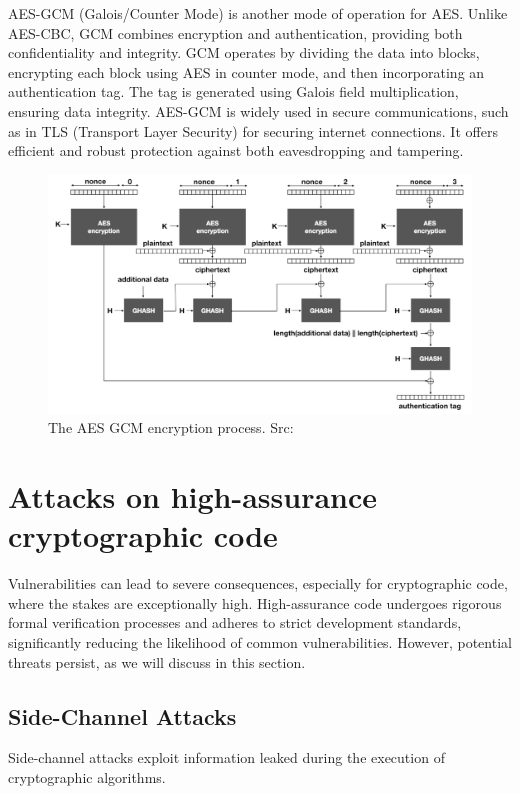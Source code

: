 \documentclass[runningheads]{llncs}
\begin{document}
AES-GCM (Galois/Counter Mode) is another mode of operation for AES. Unlike AES-CBC, GCM combines encryption and authentication, providing both confidentiality and integrity. GCM operates by dividing the data into blocks, encrypting each block using AES in counter mode, and then incorporating an authentication tag. The tag is generated using Galois field multiplication, ensuring data integrity. AES-GCM is widely used in secure communications, such as in TLS (Transport Layer Security) for securing internet connections. It offers efficient and robust protection against both eavesdropping and tampering.

\begin{figure}[ht] %
    \centering
    \includegraphics[scale=0.55]{resources/AES_GCM.png}
    \caption{The AES GCM encryption process. Src: \cite{book_real_world_crypto}}
\end{figure}

\section{Attacks on high-assurance cryptographic code}

Vulnerabilities can lead to severe consequences, especially for cryptographic code, where the stakes are exceptionally high. High-assurance code undergoes rigorous formal verification processes and adheres to strict development standards, significantly reducing the likelihood of common vulnerabilities. However, potential threats persist, as we will discuss in this section.


\subsection{Side-Channel Attacks}
Side-channel attacks\cite{paper_side_channel_attacks} exploit information leaked during the execution of cryptographic algorithms.
\end{document}
